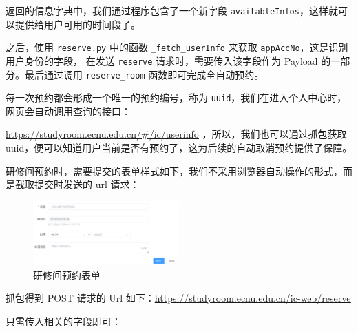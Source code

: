\documentclass[14pt,a4paper,UTF8,twoside]{article}
\begin{document}
返回的信息字典中，我们通过程序包含了一个新字段 \texttt{availableInfos}，这样就可以提供给用户可用的时间段了。

之后，使用 \texttt{reserve.py} 中的函数 \texttt{\_fetch\_userInfo} 来获取 \texttt{appAccNo}，这是识别用户身份的字段，
在发送 \texttt{reserve} 请求时，需要传入该字段作为 Payload 的一部分。最后通过调用 \texttt{reserve\_room} 函数即可完成全自动预约。

\begin{note}
每一次预约都会形成一个唯一的预约编号，称为 \texttt{uuid}，我们在进入个人中心时，网页会自动调用查询的接口：

\href{https://studyroom.ecnu.edu.cn/#/ic/userinfo}{\underline{https://studyroom.ecnu.edu.cn/\#/ic/userinfo}}
，所以，我们也可以通过抓包获取 uuid，便可以知道用户当前是否有预约了，这为后续的自动取消预约提供了保障。
\end{note}

研修间预约时，需要提交的表单样式如下，我们不采用浏览器自动操作的形式，而是截取提交时发送的 url 请求：

\begin{figure}[H]
    \centering
    \includegraphics[width=0.5\textwidth]{img/studyroom_submit.png}
    \caption{研修间预约表单}
    \label{fig:studyroom_reserve}
\end{figure}

抓包得到 POST 请求的 Url 如下：\href{https://studyroom.ecnu.edu.cn/ic-web/reserve}{\underline{https://studyroom.ecnu.edu.cn/ic-web/reserve}}

只需传入相关的字段即可：
\end{document}
